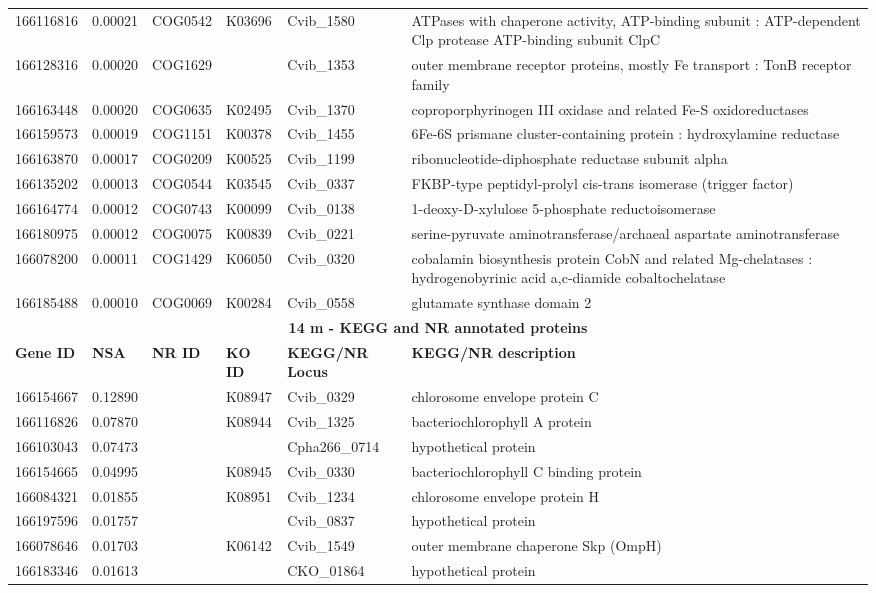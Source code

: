 \begin{landscape}
\begin{longtable}{p{1.6cm}p{1.2cm}p{1.5cm}p{1.5cm}p{2.8cm}p{13.5cm}}
166116816&0.00021&COG0542&K03696&Cvib\_1580&ATPases with chaperone activity, ATP-binding subunit : ATP-dependent Clp protease ATP-binding subunit ClpC \\
166128316&0.00020&COG1629&&Cvib\_1353&outer membrane receptor proteins, mostly Fe transport : TonB receptor family \\
166163448&0.00020&COG0635&K02495&Cvib\_1370&coproporphyrinogen III oxidase and related Fe-S oxidoreductases \\
166159573&0.00019&COG1151&K00378&Cvib\_1455&6Fe-6S prismane cluster-containing protein : hydroxylamine reductase \\
166163870&0.00017&COG0209&K00525&Cvib\_1199&ribonucleotide-diphosphate reductase subunit alpha \\
166135202&0.00013&COG0544&K03545&Cvib\_0337&FKBP-type peptidyl-prolyl cis-trans isomerase (trigger factor) \\
166164774&0.00012&COG0743&K00099&Cvib\_0138&1-deoxy-D-xylulose 5-phosphate reductoisomerase \\
166180975&0.00012&COG0075&K00839&Cvib\_0221&serine-pyruvate aminotransferase/archaeal aspartate aminotransferase \\
166078200&0.00011&COG1429&K06050&Cvib\_0320&cobalamin biosynthesis protein CobN and related Mg-chelatases : hydrogenobyrinic acid a,c-diamide cobaltochelatase \\
166185488&0.00010&COG0069&K00284&Cvib\_0558&glutamate synthase domain 2 \\
\multicolumn{6}{c}{\textbf{14 m - KEGG and NR annotated proteins}}  \\
\textbf{Gene ID} & \textbf{NSA} & \textbf{NR ID} & \textbf{KO ID} & \textbf{KEGG/NR Locus} & \textbf{KEGG/NR description} \\
166154667&0.12890&&K08947&Cvib\_0329&chlorosome envelope protein C \\
166116826&0.07870&&K08944&Cvib\_1325&bacteriochlorophyll A protein \\
166103043&0.07473&&&Cpha266\_0714&hypothetical protein \\
166154665&0.04995&&K08945&Cvib\_0330&bacteriochlorophyll C binding protein \\
166084321&0.01855&&K08951&Cvib\_1234&chlorosome envelope protein H \\
166197596&0.01757&&&Cvib\_0837&hypothetical protein \\
166078646&0.01703&&K06142&Cvib\_1549&outer membrane chaperone Skp (OmpH) \\
166183346&0.01613&&&CKO\_01864&hypothetical protein \\

\end{longtable}
\end{landscape}
